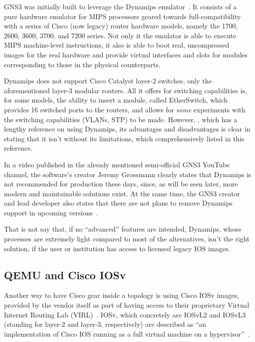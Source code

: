 GNS3 was initially built to leverage the Dynamips emulator~\cite{thebookofgns3}.
It consists of a pure hardware emulator for MIPS processors geared towards full-compatibility with a series of Cisco (now legacy) router hardware models, namely the 1700, 2600, 3600, 3700, and 7200 series. %
Not only it the emulator is able to execute MIPS machine-level instructions, it also is able to boot real, uncompressed images for the real hardware and provide virtual interfaces and slots for modules corresponding to those in the physical counterparts.

Dynamips does not support Cisco Catalyst layer-2 switches, only the aforementioned layer-3 modular routers.
All it offers for switching capabilities is, for some models, the ability to insert a module, called EtherSwitch, which provides 16 switched ports to the routers, and allows for \emph{some} experiments with the switching capabilities (VLANs, STP) to be made.
However, \cite{thebookofgns3}, which has a lengthy reference on using Dynamips, its advantages and disadvantages is clear in stating that it isn't without its limitations, which comprehensively listed in this reference.

In a video published in the already mentioned semi-official GNS3 YouTube channel, the software's creator Jeremy Grossmann clearly states that Dynamips is not recommended for production these days, since, as will be seen later, more modern and maintainable solutions exist. At the same time, the GNS3 creator and lead developer also states that there are not plans to remove Dynamips support in upcoming versions~\cite{ytdynamipsvpcs}.

That is not say that, if no ``advanced'' features are intended, Dynamips, whose processes are extremely light compared to most of the alternatives, isn't the right solution, if the user or institution has access to licensed legacy IOS images. %

\subsection{QEMU and Cisco IOSv}
\label{subsec:gns3ciscoiosv}

Another way to have Cisco gear inside a topology is using Cisco IOSv images, provided by the vendor itself as part of having access to their proprietary Virtual Internet Routing Lab (VIRL)~\cite{ciscovirl}.
IOSv, which concretely are IOSvL2 and IOSvL3 (standing for layer-2 and layer-3, respectively) are described as ``an implementation of Cisco IOS running as a full virtual machine on a hypervisor''~\cite{ciscoiosvinfo}.

